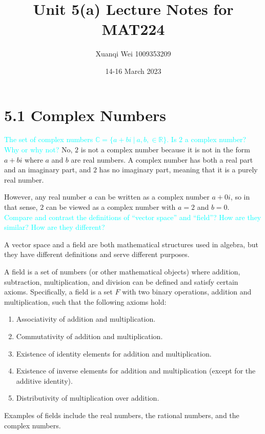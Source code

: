 \documentclass[fontsize=12pt]{scrartcl}
\title{Unit 5(a) Lecture Notes for MAT224}
\author{Xuanqi Wei 1009353209}
\date{14-16 March 2023}
\begin{document}
\maketitle

\newpage


\section{5.1 Complex Numbers}

\bigskip

\noindent
\textcolor{cyan}{The set of complex numbers $\mathbb{C} = \{ a + bi \ | \ a, b, \in \mathbb{R} \}$. Is $2$ a complex number? Why or why not?}
\noindent
No, $2$ is not a complex number because it is not in the form $a+bi$ where $a$ and $b$ are real numbers. A complex number has both a real part and an imaginary part, and $2$ has no imaginary part, meaning that it is a purely real number.

\noindent
However, any real number $a$ can be written as a complex number $a+0i$, so in that sense, $2$ can be viewed as a complex number with $a=2$ and $b=0$.
\\

\noindent
\textcolor{cyan}{Compare and contrast the definitions of ``vector space'' and ``field''? How are they similar? How are they different?}

\noindent
A vector space and a field are both mathematical structures used in algebra, but they have different definitions and serve different purposes.

\noindent
A field is a set of numbers (or other mathematical objects) where addition, subtraction, multiplication, and division can be defined and satisfy certain axioms. Specifically, a field is a set $F$ with two binary operations, addition and multiplication, such that the following axioms hold:

\begin{enumerate}
	\item Associativity of addition and multiplication.
	\item Commutativity of addition and multiplication.
	\item Existence of identity elements for addition and multiplication.
	\item Existence of inverse elements for addition and multiplication (except for the additive identity).
	\item Distributivity of multiplication over addition.
\end{enumerate}
\noindent
Examples of fields include the real numbers, the rational numbers, and the complex numbers.
\end{document}
